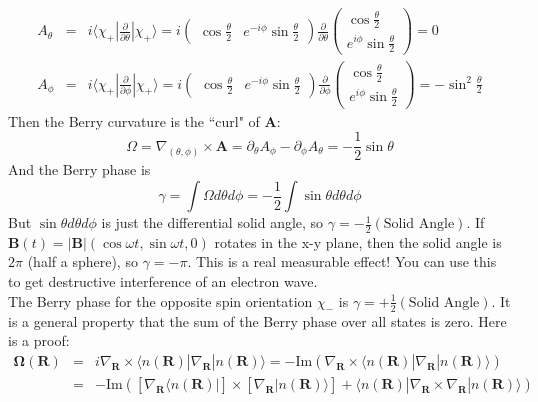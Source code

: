 \documentclass[a4paper,12pt]{article}
\renewcommand{\vec}[1]{\boldsymbol{\mathbf{#1}}}
\begin{document}
\begin{eqnarray}
A_{\theta} &=& i \langle \chi_+ | \frac{\partial}{\partial \theta} | \chi_+ \rangle = i \left(
\begin{matrix}
\cos{\frac{\theta}{2}} & e^{-i\phi} \sin{\frac{\theta}{2}}
\end{matrix}
\right)
\frac{\partial}{\partial \theta} \left(
\begin{matrix}
\cos{\frac{\theta}{2}} \\
e^{i\phi} \sin{\frac{\theta}{2}}
\end{matrix}
\right) = 0
\\
A_{\phi} &=& i \langle \chi_+ | \frac{\partial}{\partial \phi} | \chi_+ \rangle = i \left(
\begin{matrix}
\cos{\frac{\theta}{2}} & e^{-i\phi} \sin{\frac{\theta}{2}}
\end{matrix}
\right)
\frac{\partial}{\partial \phi} \left(
\begin{matrix}
\cos{\frac{\theta}{2}} \\
e^{i\phi} \sin{\frac{\theta}{2}}
\end{matrix}
\right) = -\sin^2 \frac{\theta}{2}
\end{eqnarray}
Then the Berry curvature is the ``curl" of $\vec{A}$:
\begin{equation}
\Omega = \nabla_{(\theta,\phi)} \times \vec{A} = \partial_\theta A_\phi - \partial_\phi A_\theta = -\frac{1}{2} \sin \theta
\end{equation}
And the Berry phase is
\begin{equation}
\gamma = \int \Omega d\theta d\phi = -\frac{1}{2} \int \sin \theta d\theta d\phi
\end{equation}
But $\sin \theta d\theta d\phi$ is just the differential solid angle, so $\gamma = -\frac{1}{2} \left( \text{Solid Angle} \right)$.  If $\vec{B}(t) = |\vec{B}| (\cos \omega t, \sin \omega t, 0)$ rotates in the x-y plane, then the solid angle is $2\pi$ (half a sphere), so $\gamma = -\pi$.  This is a real measurable effect!  You can use this to get destructive interference of an electron wave. \\
The Berry phase for the opposite spin orientation $\chi_-$ is $\gamma = +\frac{1}{2} \left( \text{Solid Angle} \right)$.  It is a general property that the sum of the Berry phase over all states is zero.  Here is a proof:
\begin{eqnarray}
\vec{\Omega}(\vec{R}) &=& i \nabla_{\vec{R}} \times \langle n(\vec{R}) | \nabla_{\vec{R}} | n(\vec{R}) \rangle = -\text{Im} \left( \nabla_{\vec{R}} \times \langle n(\vec{R}) | \nabla_{\vec{R}} | n(\vec{R}) \rangle \right) \\
&=& -\text{Im} \left( \left[ \nabla_{\vec{R}} \langle n(\vec{R}) | \right] \times \left[ \nabla_{\vec{R}} | n(\vec{R}) \rangle \right] + \langle n(\vec{R}) | \nabla_{\vec{R}} \times \nabla_{\vec{R}} | n(\vec{R}) \rangle \right)
\end{eqnarray}
\end{document}
